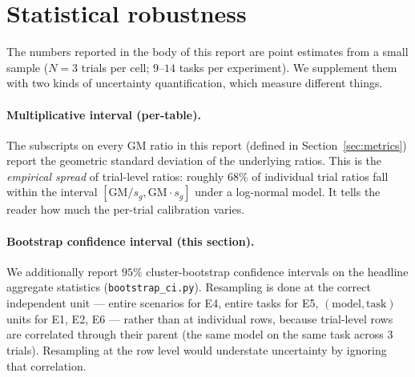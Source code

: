 \documentclass[11pt]{article}
\newcommand{\code}[1]{\texttt{\small #1}}
\begin{document}
\section{Statistical robustness}
\label{sec:ci}

The numbers reported in the body of this report are point estimates from a small sample
($N = 3$ trials per cell; $9$--$14$ tasks per experiment). We supplement them with two
kinds of uncertainty quantification, which measure different things.

\paragraph{Multiplicative interval (per-table).} The subscripts on every GM ratio in this
report (defined in Section~\ref{sec:metrics}) report the geometric standard deviation of the
underlying ratios. This is the \emph{empirical spread} of trial-level ratios: roughly
$68\%$ of individual trial ratios fall within the interval $[\mathrm{GM}/s_g, \mathrm{GM}
\cdot s_g]$ under a log-normal model. It tells the reader how much the per-trial
calibration varies.

\paragraph{Bootstrap confidence interval (this section).} We additionally report $95\%$
cluster-bootstrap confidence intervals on the headline aggregate statistics
(\code{bootstrap\_ci.py}). Resampling is done at the correct independent unit --- entire
scenarios for E4, entire tasks for E5, $(\text{model}, \text{task})$ units for E1, E2, E6
--- rather than at individual rows, because trial-level rows are correlated through their
parent (the same model on the same task across $3$ trials). Resampling at the row level
would understate uncertainty by ignoring that correlation.
\end{document}
